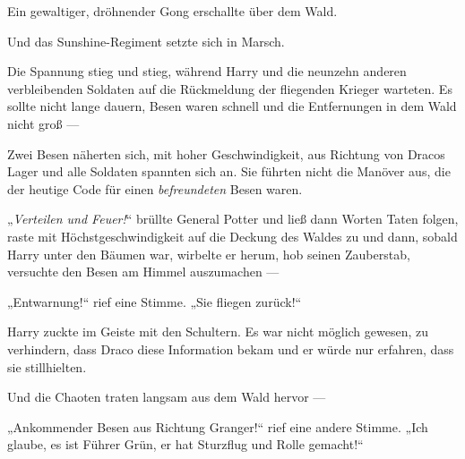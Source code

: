 \later

Ein gewaltiger, dröhnender Gong erschallte über dem Wald.

Und das Sunshine-Regiment setzte sich in Marsch.

\later

Die Spannung stieg und stieg, während Harry und die neunzehn anderen verbleibenden Soldaten auf die Rückmeldung der fliegenden Krieger warteten. Es sollte nicht lange dauern, Besen waren schnell und die Entfernungen in dem Wald nicht groß —

Zwei Besen näherten sich, mit hoher Geschwindigkeit, aus Richtung von Dracos Lager und alle Soldaten spannten sich an. Sie führten nicht die Manöver aus, die der heutige Code für einen \emph{befreundeten} Besen waren.

„\emph{Verteilen und Feuer!}“ brüllte General Potter und ließ dann Worten Taten folgen, raste mit Höchstgeschwindigkeit auf die Deckung des Waldes zu und dann, sobald Harry unter den Bäumen war, wirbelte er herum, hob seinen Zauberstab, versuchte den Besen am Himmel auszumachen —

„Entwarnung!“ rief eine Stimme.
„Sie fliegen zurück!“

Harry zuckte im Geiste mit den Schultern. Es war nicht möglich gewesen, zu verhindern, dass Draco diese Information bekam und er würde nur erfahren, dass sie stillhielten.

Und die Chaoten traten langsam aus dem Wald hervor —

„Ankommender Besen aus Richtung Granger!“ rief eine andere Stimme.
„Ich glaube, es ist Führer Grün, er hat Sturzflug und Rolle gemacht!“

